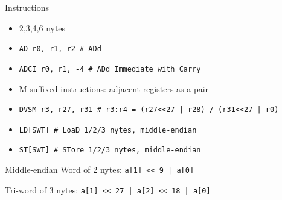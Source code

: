 \documentclass{beamer}
\begin{document}
\begin{frame}{Instructions}
  \begin{itemize}
  \item 2,3,4,6 nytes
  \item \texttt{AD r0, r1, r2  \# ADd}
  \item \texttt{ADCI r0, r1, -4  \# ADd Immediate with Carry}
  \item \alert{M}-suffixed instructions: \alert{adjacent registers} as a pair
  \item \texttt{DVS\alert{M} r3, r27, r31  \# r3:r4 = (r27<<27 | r28) / (r31<<27 | r0)}
  \item \texttt{LD[S\alert{WT}]  \# LoaD 1/2/3 nytes, middle-endian}
  \item \texttt{ST[S\alert{WT}]  \# STore 1/2/3 nytes, middle-endian}
  \end{itemize}
\end{frame}

\begin{frame}{Middle-endian}
  \alert{W}ord of 2 nytes: \texttt{a[1] << 9 | a[0]}

  \begin{center}
  \end{center}

  \alert{T}ri-word of 3 nytes: \texttt{a[1] << 27 | a[2] << 18 | a[0]}

  \begin{center}
  \end{center}
\end{frame}
\end{document}
